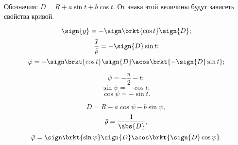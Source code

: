 Обозначим: $D = R + a\sin{t} + b\cos{t}$. От знака этой величины будут зависеть свойства кривой.

$$\sign{y} = -\sign\brkt{\cos{t}}\sign{D};$$
$$\frac{\bar{x}}{\bar{\rho}} = -\sign{D}\sin{t};$$
$$\bar{\varphi} = -\sign\brkt{\cos{t}}\sign{D}\acos\brkt{-\sign{D}\sin{t}};$$

$$\psi = -\frac{\pi}{2}-t;$$
$$\sin{\psi} = -\cos{t};$$
$$\cos{\psi} = -\sin{t}.$$

$$D = R - a\cos{\psi} - b\sin{\psi},$$
$$\bar{\rho} = \frac{1}{\abs{D}},$$
$$\bar{\varphi} = \sign\brkt{\sin{\psi}}\sign{D}\acos\brkt{\sign{D}\cos{\psi}}.$$
